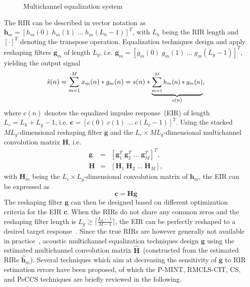 \documentclass{article}
\begin{document}
\begin{figure}[t!]
  \caption{Multichannel equalization system}
  \label{fig: acsys}
\end{figure}

\noindent The RIR can be described in vector notation as $\mathbf{h}_m = [h_m(0) \; h_m(1) \; \ldots \; h_m(L_h-1)]^T$, with $L_h$ being the RIR length and $[\cdot]^T$ denoting the transpose operation.
Equalization techniques design and apply reshaping filters $\mathbf{g}_m$ of length $L_g$, i.e. $\mathbf{g}_m = [g_m(0) \; g_m(1) \; \ldots \; g_m(L_g-1)]^T$, yielding the output signal
\begin{equation}
  \small
  \hat{s}(n)  = \sum_{m=1}^M x_m(n) \ast g_m(n) =  s(n) \ast \underbrace{\sum_{m=1}^M h_m(n) \ast g_m(n)}_{c(n)},
\end{equation}
where $c(n)$ denotes the equalized impulse response~(EIR) of length $L_c = L_h+L_g-1$, i.e. $\mathbf{c} = [c(0) \; c(1) \; \ldots \; c(L_c-1)]^T$.
Using the stacked $ML_g$-dimensional reshaping filter $\mathbf{g}$ and the $L_c \times ML_g$-dimensional multichannel convolution matrix $\mathbf{H}$, i.e.
\begin{eqnarray}
  \mathbf{g} &=& [\mathbf{g}_1^T \; \mathbf{g}_2^T \; \ldots \; \mathbf{g}_M^T]^T, \\
  \mathbf{H} &=& [\mathbf{H}_1 \; \mathbf{H}_2 \; \ldots \; \mathbf{H}_M],
\end{eqnarray}
with $\mathbf{H}_m$ being the $L_c \times L_g$-dimensional convolution matrix of $\mathbf{h}_m$, the EIR can be expressed as
\begin{equation}
  \label{eq: trueeir}
  \boxed{\mathbf{c} = \mathbf{H} \mathbf{g}}
\end{equation}
The reshaping filter $\mathbf{g}$ can then be designed based on different optimization criteria for the EIR $\mathbf{c}$.
When the RIRs do not share any common zeros and the reshaping filter length is $L_g \geq \lceil \frac{L_h-1}{M-1}\rceil$, the EIR can be perfectly reshaped to a desired target response~\cite{Kodrasi_ITASLP_2013,Miyoshi_ITASS_1988}.
Since the true RIRs are however generally not available in practice~\cite{Hasan_EUSIPCO_2006}, acoustic multichannel equalization techniques design $\mathbf{g}$ using the estimated multichannel convolution matrix $\hat{\mathbf{H}}$~(constructed from the estimated RIRs $\hat{\mathbf{h}}_m$).
Several techniques which aim at decreasing the sensitivity of $\mathbf{g}$ to RIR estimation errors have been proposed, of which the P-MINT, RMCLS-CIT, CS, and PeCCS techniques are briefly reviewed in the following.
\end{document}

